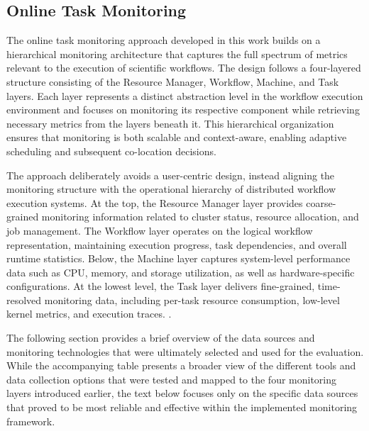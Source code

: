 
\subsection{Online Task Monitoring}
\label{sec:online_task_monitoring}

The online task monitoring approach developed in this work builds on a hierarchical monitoring architecture that captures the full spectrum of metrics relevant to the execution of scientific workflows. The design follows a four-layered structure consisting of the Resource Manager, Workflow, Machine, and Task layers. Each layer represents a distinct abstraction level in the workflow execution environment and focuses on monitoring its respective component while retrieving necessary metrics from the layers beneath it. This hierarchical organization ensures that monitoring is both scalable and context-aware, enabling adaptive scheduling and subsequent co-location decisions.

The approach deliberately avoids a user-centric design, instead aligning the monitoring structure with the operational hierarchy of distributed workflow execution systems. At the top, the Resource Manager layer provides coarse-grained monitoring information related to cluster status, resource allocation, and job management. The Workflow layer operates on the logical workflow representation, maintaining execution progress, task dependencies, and overall runtime statistics. Below, the Machine layer captures system-level performance data such as CPU, memory, and storage utilization, as well as hardware-specific configurations. At the lowest level, the Task layer delivers fine-grained, time-resolved monitoring data, including per-task resource consumption, low-level kernel metrics, and execution traces.
\cite{Bader_2022}.

The following section provides a brief overview of the data sources and monitoring technologies that were ultimately selected and used for the evaluation. While the accompanying table presents a broader view of the different tools and data collection options that were tested and mapped to the four monitoring layers introduced earlier, the text below focuses only on the specific data sources that proved to be most reliable and effective within the implemented monitoring framework.

